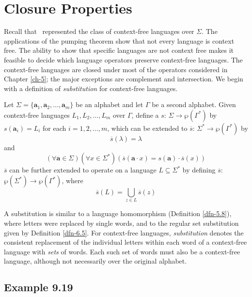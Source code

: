 \section{Closure Properties}\label{sec-9.5}

Recall that \CSIG\ represented the class of context-free languages over $\Sigma$.
The applications of the pumping theorem show that not every language is context
free. The ability to show that specific languages are not context free makes it
feasible to decide which language operators preserve context-free languages. The
context-free languages are closed under most of the operators considered in
Chapter \ref{ch-5}; the major exceptions are complement and intersection. We begin with a
definition of \emph{substitution} for context-free languages.

\begin{dfn}\label{dfn-9.11}
Let $\Sigma=\{\pmb{a}_1,\pmb{a}_2,\ldots,\pmb{a}_m\}$ be an alphabet and let
$\Gamma$ be a second alphabet. Given context-free languages $L_1,L_2,\ldots,L_m$
over $\Gamma$, define a \emph{} $s$: $\Sigma\rightarrow\wp
(\Gamma^*)$ by $s(\pmb{a}_i) = L_i$ for each $i=1,2,\ldots,m$, which can be
extended to $\overline{s}$: $\Sigma^* \rightarrow \wp(\Gamma^*)$ by
\[ \overline{s}(\lambda) = \lambda \]
and
\[ (\forall\pmb{a}\in\Sigma)(\forall x\in\Sigma^*)(\overline{s}(\pmb{a}\cdot x)
	= s(\pmb{a})\cdot\overline{s}(x)) \]
$\overline{s}$ can be further extended to operate on a language $L\subseteq
\Sigma^*$ by defining $\overline{s}$: $\wp(\Sigma^*)\rightarrow\wp(\Gamma^*)$,
where
\[ \overline{s}(L) = \bigcup\limits_{z\in L} \overline{s}(z) \]
\end{dfn}

A substitution is similar to a language homomorphism (Definition \ref{dfn-5.8}), where
letters were replaced by single words, and to the regular set substitution given
by Definition \ref{dfn-6.5}. For context-free languages, \emph{substitution} denotes the
consistent replacement of the individual letters within each word of a
context-free language with \emph{sets} of words. Each such set of words must also be a
context-free language, although not necessarily over the original alphabet.

\subsection*{Example 9.19}


